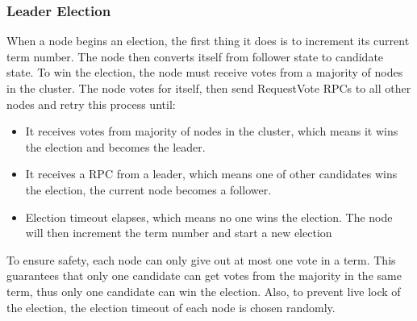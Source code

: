 \documentclass[12pt, a4paper]{article}
\begin{document}
  \subsubsection{Leader Election}
  When a node begins an election, the first thing it does is to increment its current term number. The node then converts itself from
  follower state to candidate state. To win the election, the node must receive votes from a majority of nodes in the cluster. The node
  votes for itself, then send RequestVote RPCs to all other nodes and retry this process until:
  \begin{itemize}
    \item It receives votes from majority of nodes in the cluster, which means it wins the election and becomes the leader.
    \item It receives a RPC from a leader, which means one of other candidates wins the election, the current node becomes a follower.
    \item Election timeout elapses, which means no one wins the election. The node will then increment the term number and start a new election
  \end{itemize}
  \par
  To ensure safety, each node can only give out at most one vote in a term. This guarantees that only one candidate can get votes from
  the majority in the same term, thus only one candidate can win the election. Also, to prevent live lock of the election, the election
  timeout of each node is chosen randomly.
\end{document}
